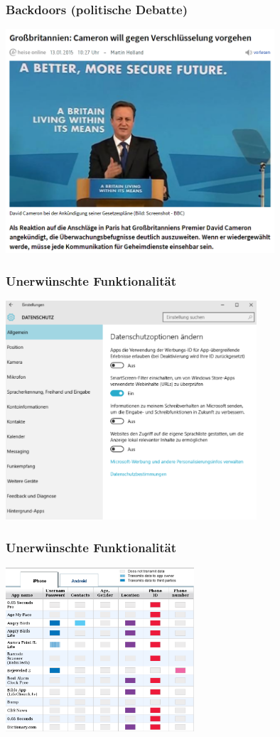 \documentclass[12pt]{beamer}
\begin{document}
\begin{frame}
  \frametitle{Backdoors (politische Debatte)}
  \begin{center}
    \includegraphics[width=10cm]{img/backdoor_gb.png}
  \par\end{center}
\end{frame}

\begin{frame}
    \frametitle{Unerwünschte Funktionalität}
    \begin{center}
      \includegraphics[width=0.7\textwidth]{img/windows10.png}
    \end{center}
\end{frame}

\begin{frame}
  \frametitle{Unerwünschte Funktionalität}
  \begin{center}
    \includegraphics[width=7cm]{img/backdoor-apps}
  \par\end{center}
\end{frame}
\end{document}
